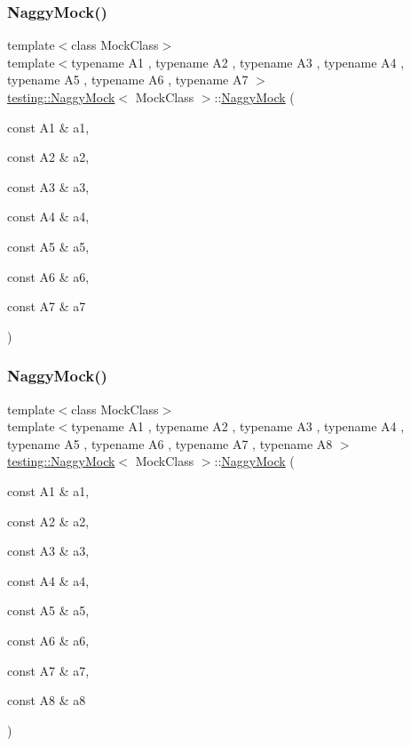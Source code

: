 \subsubsection{\texorpdfstring{NaggyMock()}{NaggyMock()}\hspace{0.1cm}{\footnotesize\ttfamily [14/17]}}
{\footnotesize\ttfamily template$<$class Mock\+Class$>$ \\
template$<$typename A1 , typename A2 , typename A3 , typename A4 , typename A5 , typename A6 , typename A7 $>$ \\
\mbox{\hyperlink{classtesting_1_1_naggy_mock}{testing\+::\+Naggy\+Mock}}$<$ Mock\+Class $>$\+::\mbox{\hyperlink{classtesting_1_1_naggy_mock}{Naggy\+Mock}} (\begin{DoxyParamCaption}\item[{const A1 \&}]{a1,  }\item[{const A2 \&}]{a2,  }\item[{const A3 \&}]{a3,  }\item[{const A4 \&}]{a4,  }\item[{const A5 \&}]{a5,  }\item[{const A6 \&}]{a6,  }\item[{const A7 \&}]{a7 }\end{DoxyParamCaption})\hspace{0.3cm}{\ttfamily [inline]}}

\mbox{\label{classtesting_1_1_naggy_mock_a63b30506f56b792ffbdc5792a9630d5e}} 
\subsubsection{\texorpdfstring{NaggyMock()}{NaggyMock()}\hspace{0.1cm}{\footnotesize\ttfamily [15/17]}}
{\footnotesize\ttfamily template$<$class Mock\+Class$>$ \\
template$<$typename A1 , typename A2 , typename A3 , typename A4 , typename A5 , typename A6 , typename A7 , typename A8 $>$ \\
\mbox{\hyperlink{classtesting_1_1_naggy_mock}{testing\+::\+Naggy\+Mock}}$<$ Mock\+Class $>$\+::\mbox{\hyperlink{classtesting_1_1_naggy_mock}{Naggy\+Mock}} (\begin{DoxyParamCaption}\item[{const A1 \&}]{a1,  }\item[{const A2 \&}]{a2,  }\item[{const A3 \&}]{a3,  }\item[{const A4 \&}]{a4,  }\item[{const A5 \&}]{a5,  }\item[{const A6 \&}]{a6,  }\item[{const A7 \&}]{a7,  }\item[{const A8 \&}]{a8 }\end{DoxyParamCaption})\hspace{0.3cm}{\ttfamily [inline]}}

